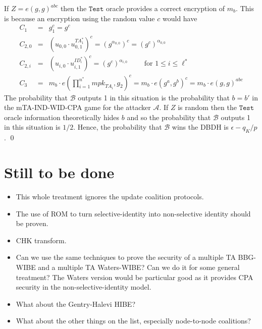 \documentclass{llncs}
\newcommand{\A}{\mathcal{A}}
\newcommand{\B}{\mathcal{B}}
\newcommand{\ID}{\mathit{ID}}
\newcommand{\TA}{\mathit{TA}}
\newcommand{\mpk}{\mathit{mpk}}
\begin{document}
If $Z=e(g,g)^{abc}$ then the $\texttt{Test}$ oracle provides a correct encryption of $m_{b}$. This is because an encryption using the random value $c$ would have 
\begin{eqnarray*}
C_{1} &=& g_{1}^{c}=g^{c}\\
C_{2,0} &=& (u_{0,0} \cdot u_{0,1}^{\TA^{*}_{1}})^{c} = (g^{\alpha_{0,0}})^{c} = (g^{c})^{\alpha_{0,0}}\\
C_{2,i} &=& (u_{i,0} \cdot u_{i,1}^{\ID^{*}_{i}})^{c} = (g^{c})^{\alpha_{i,0}} \qquad \mbox{ for } 1\leq i\leq \ell^{*}\\
C_{3} &=& m_{b} \cdot e(\prod_{i=1}^{n^{*}} \mpk_{\TA_{i}},g_{2})^{c}
= m_{b} \cdot e(g^{a},g^{b})^{c} = m_{b} \cdot e(g,g)^{abc}
\end{eqnarray*}
The probability that $\B$ outputs 1 in this situation is the probability that $b=b'$ in the mTA-IND-WID-CPA game for the attacker $\A$. If $Z$ is random then the $\texttt{Test}$ oracle information theoretically hides $b$ and so the probability that $\B$ outputs 1 in this situation is $1/2$. Hence, the probability that $\B$ wins the DBDH is $\epsilon-q_{K}/p$. \qed

\section{Still to be done}

\begin{itemize}
\item This whole treatment ignores the update coalition protocols.
\item The use of ROM to turn selective-identity into non-selective identity should be proven.
\item CHK transform.
\item Can we use the same techniques to prove the security of a multiple TA BBG-WIBE and a multiple TA Waters-WIBE? Can we do it for some general treatment? The Waters version would be particular good as it provides CPA security in the non-selective-identity model.
\item What about the Gentry-Halevi HIBE?
\item What about the other things on the list, especially node-to-node coalitions?
\end{itemize}



\end{document}
